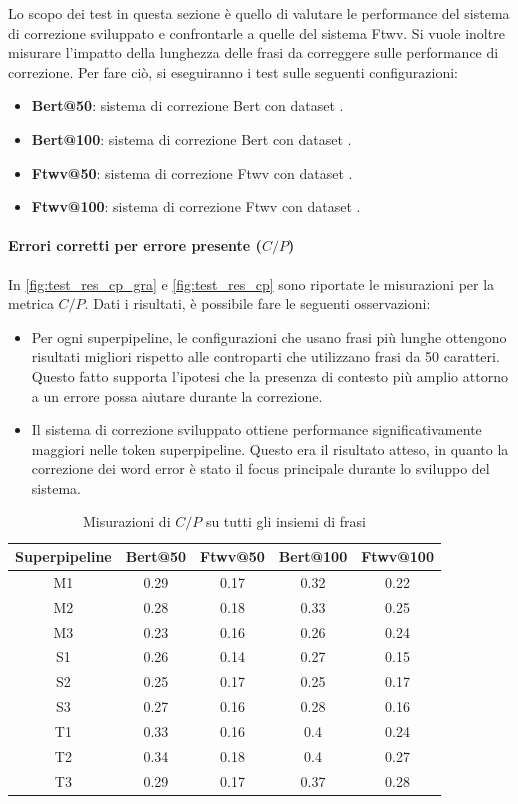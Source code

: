 Lo scopo dei test in questa sezione è quello di valutare le performance del sistema di correzione sviluppato e confrontarle a quelle del sistema Ftwv. Si vuole inoltre misurare l'impatto della lunghezza delle frasi da correggere sulle performance di correzione. Per fare ciò, si eseguiranno i test sulle seguenti configurazioni:
\begin{itemize}
\item \textbf{Bert@50}: sistema di correzione Bert con dataset \dsta.
\item \textbf{Bert@100}: sistema di correzione Bert con dataset \dstb.
\item \textbf{Ftwv@50}: sistema di correzione Ftwv con dataset \dsta.
\item \textbf{Ftwv@100}: sistema di correzione Ftwv con dataset \dstb.
\end{itemize}





\paragraph{Errori corretti per errore presente ($C/P$)}
In \autoref{fig:test_res_cp_gra} e \autoref{fig:test_res_cp} sono riportate le misurazioni per la metrica $C/P$. Dati i risultati, è possibile fare le seguenti osservazioni:
\begin{itemize}
\item Per ogni superpipeline, le configurazioni che usano frasi più lunghe ottengono risultati migliori rispetto alle controparti che utilizzano frasi da 50 caratteri. Questo fatto supporta l'ipotesi che la presenza di contesto più amplio attorno a un errore possa aiutare durante la correzione.

\item Il sistema di correzione sviluppato ottiene performance significativamente maggiori nelle token superpipeline. Questo era il risultato atteso, in quanto la correzione dei word error è stato il focus principale durante lo sviluppo del sistema.

\end{itemize}

\begin{table}[H]
\centering
\begin{tabular}{c|cc|cc}
\textbf{Superpipeline} & \textbf{Bert@50} &  \textbf{Ftwv@50} & \textbf{Bert@100} & \textbf{Ftwv@100}\\
\hline
M1& 0.29& 0.17& 0.32& 0.22\\
M2& 0.28& 0.18& 0.33& 0.25\\
M3& 0.23& 0.16& 0.26& 0.24\\
S1& 0.26& 0.14& 0.27& 0.15\\
S2& 0.25& 0.17& 0.25& 0.17\\
S3& 0.27& 0.16& 0.28& 0.16\\
T1& 0.33& 0.16& 0.4& 0.24\\
T2& 0.34& 0.18& 0.4& 0.27\\
T3& 0.29& 0.17& 0.37& 0.28\\
\end{tabular}
\caption{Misurazioni di $C/P$ su tutti gli insiemi di frasi}
\label{fig:test_res_cp_gra}
\end{table}

